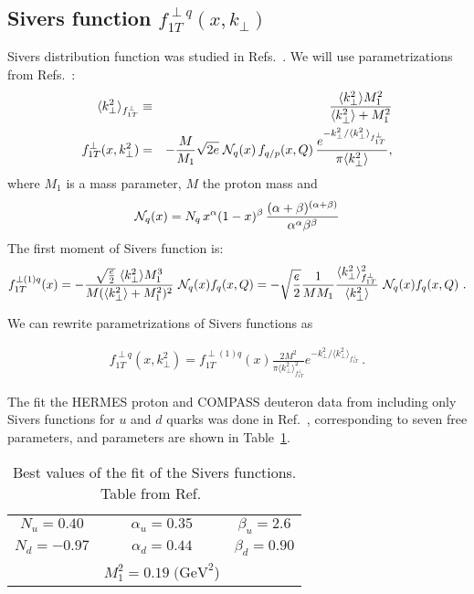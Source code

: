 \documentclass[a4paper,11pt]{article}
\newcommand{\ba}{\begin{eqnarray}}
\newcommand{\ea}{\end{eqnarray}}
\newcommand{\la}{\langle}
\newcommand{\ra}{\rangle}
\def\kperp{k_\perp}
\def\avkperp{\la \kperp^2 \ra}
\begin{document}
\subsection{\boldmath Sivers function $f_{1T}^{\perp q}(x,k_\perp)$}
\label{App:basis-f1Tperp}

Sivers distribution function was studied in Refs.~\cite{Efremov:2004tp,Anselmino:2008sga,Anselmino:2011gs,Anselmino:2011ch, Aybat:2011ge,Gamberg:2013kla,Bacchetta:2011gx,Anselmino:2012aa,Sun:2013dya,Echevarria:2014xaa}. 
We will use parametrizations from  Refs.~\cite{Anselmino:2008sga,Anselmino:2011gs,Anselmino:2011ch}:
\ba
 \avkperp_{f_{1T}^\perp} &\equiv& \frac{\avkperp M_1^2}{\avkperp + M_1^2} \\
f_{1T}^{\perp}(x, \kperp^2)& =& - \frac {M}{M_1} \sqrt{2e} \;
{\cal N}_q(x) \, f_{q/p} (x,Q) \, \frac{e^{-\kperp^2/{\avkperp_{f_{1T}^\perp}}}}{\pi \avkperp} ,
\label{fiTp}
\ea
%
where $M_1$ is a mass parameter, $M$ the proton mass and
%
\ba
{\cal N}_q(x)= N_q \, x^{\alpha} (1-x)^{\beta} \,
\frac{(\alpha + \beta)^{(\alpha +\beta)}}
{\alpha^{\alpha} \beta^{\beta}}
 \ea
The first moment of Sivers function is:
\ba
f_{1T}^{\perp (1) q}(x)  = -\frac{\sqrt{\frac{e}{2}} \ \avkperp M_1^3}{M (\avkperp + M_1^2)^2}  \ {\cal N}_q(x)  f_q(x, Q) = -\sqrt{\frac{e}{2}} \frac{1}{M M_1}  \frac{\avkperp_{f_{1T}^\perp}^2}{\avkperp}    \ {\cal N}_q(x)  f_q(x, Q)
\label{siversm} \ .
\ea

We can rewrite parametrizations of Sivers functions as

\ba
f_{1T}^{\perp q}(x,\kperp^2) =  f_{1T}^{\perp (1) q}(x)   \frac{2 M^2}{\pi \avkperp_{f_{1T}^\perp}^2} e^{-\kperp^2/{\avkperp_{f_{1T}^\perp}}}
\label{sivers_new} \ .
\ea

The fit the HERMES proton and COMPASS deuteron data from 
including only Sivers functions for $u$ and $d$ quarks was done in Ref.~\cite{Anselmino:2011gs},
corresponding to seven free parameters, and parameters are shown in Table~\ref{tab:a}.


\begin{table}
\centering
\begin{tabular}{ccc}
\hline
$N_u=0.40$ & $\alpha_u=0.35$ & $\beta_u=2.6$ \\
$N_d=-0.97$ & $\alpha_d=0.44$ & $\beta_d=0.90$\\
& $M_1^2=0.19\; \textrm{(GeV}^2$) &   \\
\hline
\end{tabular}
\caption{Best values of the fit of the Sivers functions. Table from Ref.~\cite{Anselmino:2011gs}}
\label{tab:a}
\end{table}
\end{document}
